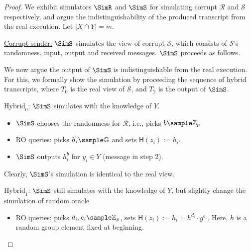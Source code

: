 \begin{proof}
We exhibit simulators $\SimR$ and $\SimS$ for simulating corrupt $\mathcal{R}$ and $\mathcal{S}$ respectively, 
and argue the indistinguishability of the produced transcript from the real execution. Let $|X \cap Y| = m$. 

\begin{trivlist}
\item \underline{Corrupt sender:} $\SimS$ simulates the view of corrupt $\mathcal{S}$, 
which consists of $\mathcal{S}$'s randomness, input, output and received messages.
$\SimS$ proceeds as follows. 

We now argue the output of $\SimS$ is indistinguishable from the real execution. 
For this, we formally show the simulation by proceeding the sequence of hybrid transcripts, 
where $T_0$ is the real view of $\mathcal{S}$, and $T_2$ is the output of $\SimS$. 

\item $\text{Hybrid}_0$: $\SimS$ simulates with the knowledge of $Y$. 
\begin{itemize}
    \item $\SimS$ chooses the randomness for $\mathcal{R}$, i.e., picks $b \sample \mathbb{Z}_p$
    
    \item RO queries: picks $h_i \sample \mathbb{G}$ and sets $\mathsf{H}(z_i):=h_i$. 

    \item $\SimS$ outputs $h_i^b$ for $y_i \in Y$ (message in step 2).     
\end{itemize}
Clearly, $\SimS$'s simulation is identical to the real view. 

\begin{center}
\end{center}

\item $\text{Hybrid}_1$: $\SimS$ still simulates with the knowledge of $Y$, 
    but slightly change the simulation of random oracle 
\begin{itemize}
    \item RO queries: picks $d_i, e_i \sample \mathbb{Z}_p$, 
        sets $\mathsf{H}(z_i):= h_i = h^{d_i} \cdot g^{e_i}$. 
        Here, $h$ is a random group element fixed at beginning.  


\end{itemize}
\end{trivlist}
\end{proof}
